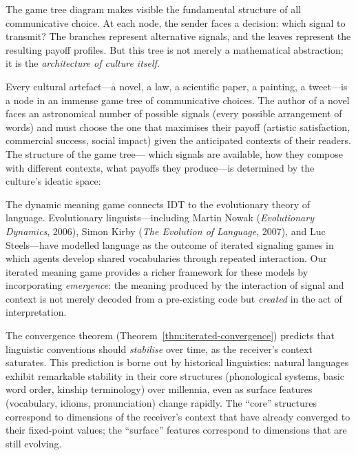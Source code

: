 \begin{interpretation}
\label{interp:ch14:game_tree_culture}
The game tree diagram makes visible the fundamental structure of all
communicative choice.  At each node, the sender faces a decision: which
signal to transmit?  The branches represent alternative signals, and the
leaves represent the resulting payoff profiles.  But this tree is not merely
a mathematical abstraction; it is the \emph{architecture of culture itself}.

Every cultural artefact---a novel, a law, a scientific paper, a painting,
a tweet---is a node in an immense game tree of communicative choices.  The
author of a novel faces an astronomical number of possible signals (every
possible arrangement of words) and must choose the one that maximises their
payoff (artistic satisfaction, commercial success, social impact) given the
anticipated contexts of their readers.  The structure of the game tree---
which signals are available, how they compose with different contexts,
what payoffs they produce---is determined by the culture's ideatic space:

\begin{interpretation}
\label{interp:ch14:dynamic_games_evolution}
The dynamic meaning game connects IDT to the evolutionary theory of
language.  Evolutionary linguists---including Martin Nowak (\emph{Evolutionary
Dynamics}, 2006), Simon Kirby (\emph{The Evolution of Language}, 2007), and
Luc Steels---have modelled language as the outcome of iterated signaling
games in which agents develop shared vocabularies through repeated
interaction.  Our iterated meaning game provides a richer framework for
these models by incorporating \emph{emergence}: the meaning produced by the
interaction of signal and context is not merely decoded from a pre-existing
code but \emph{created} in the act of interpretation.

The convergence theorem (Theorem~\ref{thm:iterated-convergence}) predicts
that linguistic conventions should \emph{stabilise} over time, as the
receiver's context saturates.  This prediction is borne out by historical
linguistics: natural languages exhibit remarkable stability in their core
structures (phonological systems, basic word order, kinship terminology)
over millennia, even as surface features (vocabulary, idioms, pronunciation)
change rapidly.  The ``core'' structures correspond to dimensions of the
receiver's context that have already converged to their fixed-point values;
the ``surface'' features correspond to dimensions that are still evolving.


\end{interpretation}
\end{interpretation}

